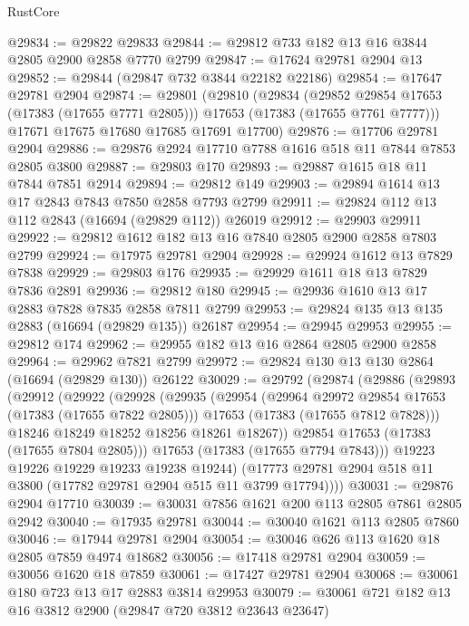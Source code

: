 \begin{lexlean}{RustCore}
\begin{coremodule}
@29834 := @29822 @29833
@29844 := @29812 @733 @182 @13 @16 @3844 @2805 @2900 @2858 @7770 @2799
@29847 := @17624 @29781 @2904 @13
@29852 := @29844 (@29847 @732 @3844 @22182 @22186)
@29854 := @17647 @29781 @2904
@29874 := @29801
    (@29810
      (@29834
        (@29852 @29854 @17653 (@17383 (@17655 @7771 @2805)))
        @17653
        (@17383 (@17655 @7761 @7777)))
      @17671
      @17675
      @17680
      @17685
      @17691
      @17700)
@29876 := @17706 @29781 @2904
@29886 := @29876 @2924 @17710 @7788 @1616 @518 @11 @7844 @7853 @2805 @3800
@29887 := @29803 @170
@29893 := @29887 @1615 @18 @11 @7844 @7851 @2914
@29894 := @29812 @149
@29903 := @29894 @1614 @13 @17 @2843 @7843 @7850 @2858 @7793 @2799
@29911 := @29824 @112 @13 @112 @2843 (@16694 (@29829 @112)) @26019
@29912 := @29903 @29911
@29922 := @29812 @1612 @182 @13 @16 @7840 @2805 @2900 @2858 @7803 @2799
@29924 := @17975 @29781 @2904
@29928 := @29924 @1612 @13 @7829 @7838
@29929 := @29803 @176
@29935 := @29929 @1611 @18 @13 @7829 @7836 @2891
@29936 := @29812 @180
@29945 := @29936 @1610 @13 @17 @2883 @7828 @7835 @2858 @7811 @2799
@29953 := @29824 @135 @13 @135 @2883 (@16694 (@29829 @135)) @26187
@29954 := @29945 @29953
@29955 := @29812 @174
@29962 := @29955 @182 @13 @16 @2864 @2805 @2900 @2858
@29964 := @29962 @7821 @2799
@29972 := @29824 @130 @13 @130 @2864 (@16694 (@29829 @130)) @26122
@30029 := @29792
    (@29874
      (@29886
        (@29893
          (@29912
            (@29922
              (@29928
                (@29935
                  (@29954
                    (@29964 @29972 @29854 @17653 (@17383 (@17655 @7822 @2805)))
                    @17653
                    (@17383 (@17655 @7812 @7828)))
                  @18246
                  @18249
                  @18252
                  @18256
                  @18261
                  @18267))
              @29854
              @17653
              (@17383 (@17655 @7804 @2805)))
            @17653
            (@17383 (@17655 @7794 @7843)))
          @19223
          @19226
          @19229
          @19233
          @19238
          @19244)
        (@17773 @29781 @2904 @518 @11 @3800 (@17782 @29781 @2904 @515 @11 @3799 @17794))))
@30031 := @29876 @2904 @17710
@30039 := @30031 @7856 @1621 @200 @113 @2805 @7861 @2805 @2942
@30040 := @17935 @29781
@30044 := @30040 @1621 @113 @2805 @7860
@30046 := @17944 @29781 @2904
@30054 := @30046 @626 @113 @1620 @18 @2805 @7859 @4974 @18682
@30056 := @17418 @29781 @2904
@30059 := @30056 @1620 @18 @7859
@30061 := @17427 @29781 @2904
@30068 := @30061 @180 @723 @13 @17 @2883 @3814 @29953
@30079 := @30061 @721 @182 @13 @16 @3812 @2900 (@29847 @720 @3812 @23643 @23647)

\end{coremodule}
\end{lexlean}
